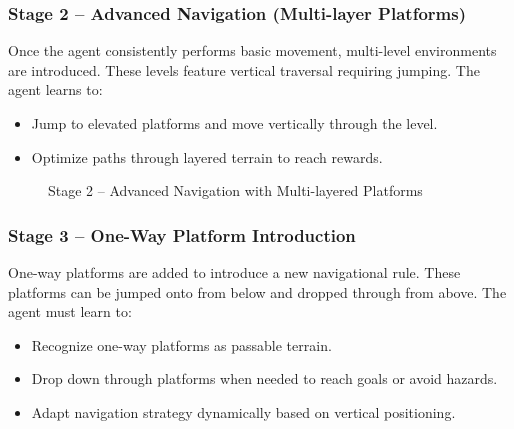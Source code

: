 \documentclass[12pt,oneside,openright,a4paper]{cpe-english-project}
\begin{document}
\subsubsection{Stage 2 – Advanced Navigation (Multi-layer Platforms)}

Once the agent consistently performs basic movement, multi-level environments are introduced. These levels feature vertical traversal requiring jumping. The agent learns to:

\begin{itemize}
\item Jump to elevated platforms and move vertically through the level.
\item Optimize paths through layered terrain to reach rewards.
\end{itemize}

\begin{figure}[H]
\centering
{}
\caption{Stage 2 – Advanced Navigation with Multi-layered Platforms}\label{fig:Stage2}
\end{figure}

\subsubsection{Stage 3 – One-Way Platform Introduction}

One-way platforms are added to introduce a new navigational rule. These platforms can be jumped onto from below and dropped through from above. The agent must learn to:

\begin{itemize}
\item Recognize one-way platforms as passable terrain.
\item Drop down through platforms when needed to reach goals or avoid hazards.
\item Adapt navigation strategy dynamically based on vertical positioning.
\end{itemize}
\end{document}
